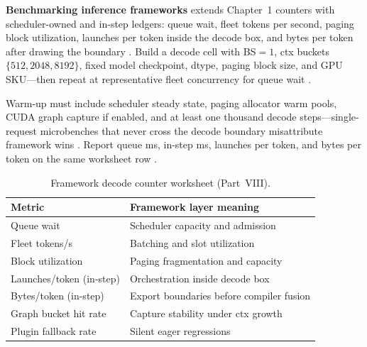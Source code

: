 \textbf{Benchmarking inference frameworks} extends Chapter~1 counters with scheduler-owned and in-step ledgers: queue wait, fleet tokens per second, paging block utilization, launches per token inside the decode box, and bytes per token after drawing the boundary \citep{patel2025llminference,kwon2023vllm,taxbreak2026,memoryfloor2026,yirage2026,chen2020compilerbasedhardw,liu2024deepseekv3,nvidia2024cudagraphs,dao2022flashattention,dao2023flashdecoding,semianalysis2024tma,amd2024xdna,amd2024aie,nvidia2022hopper,dlbook}. Build a decode cell with BS${=}1$, ctx buckets $\{512,2048,8192\}$, fixed model checkpoint, dtype, paging block size, and GPU SKU---then repeat at representative fleet concurrency for queue wait \citep{kwon2023vllm,patel2025llminference,taxbreak2026,memoryfloor2026,yirage2026,chen2020compilerbasedhardw,liu2024deepseekv3,nvidia2024cudagraphs,dao2022flashattention,amd2024xdna,amd2024aie,dlbook,dao2023flashdecoding,nvidia2022hopper,semianalysis2024tma}.

Warm-up must include scheduler steady state, paging allocator warm pools, CUDA graph capture if enabled, and at least one thousand decode steps---single-request microbenches that never cross the decode boundary misattribute framework wins \citep{kwon2023vllm,patel2025llminference,nvidia2024cudagraphs,memoryfloor2026,taxbreak2026,yirage2026,chen2020compilerbasedhardw,liu2024deepseekv3,dao2022flashattention,amd2024aie,amd2024xdna,dlbook,dao2023flashdecoding,nvidia2022hopper,semianalysis2024tma}. Report queue ms, in-step ms, launches per token, and bytes per token on the same worksheet row \citep{patel2025llminference,taxbreak2026,memoryfloor2026,yirage2026,chen2020compilerbasedhardw,kwon2023vllm,liu2024deepseekv3,nvidia2024cudagraphs,dao2022flashattention,dlbook}.

\begin{table}[t]
\centering
\small
\begin{tabular}{@{}ll@{}}
\toprule
\textbf{Metric} & \textbf{Framework layer meaning} \\
\midrule
Queue wait & Scheduler capacity and admission \\
Fleet tokens/s & Batching and slot utilization \\
Block utilization & Paging fragmentation and capacity \\
Launches/token (in-step) & Orchestration inside decode box \\
Bytes/token (in-step) & Export boundaries before compiler fusion \\
Graph bucket hit rate & Capture stability under ctx growth \\
Plugin fallback rate & Silent eager regressions \\
\bottomrule
\end{tabular}
\caption{Framework decode counter worksheet (Part~VIII).}
\label{tab:ch28_framework_benchmark}
\end{table}

